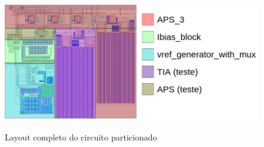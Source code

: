 \begin{figure}[htb]
 \centering
    \caption{Layout completo do circuito particionado} 
    \includegraphics[scale=0.4]{Resultados/Imagens/Image_CircuitoCompleto.png}
    \label{layoutcompleto_division}
\end{figure}

